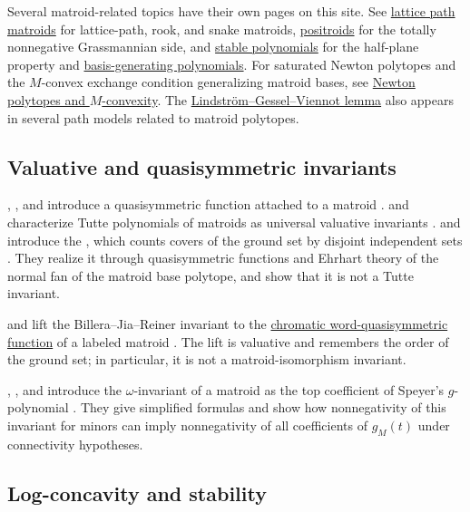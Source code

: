 Several matroid-related topics have their own pages on this site.  See
\hyperref[latticePathMatroids]{lattice path matroids} for lattice-path,
rook, and snake matroids, \hyperref[positroid]{positroids} for the
totally nonnegative Grassmannian side, and
\hyperref[stablePolynomial]{stable polynomials} for the half-plane property
and \hyperref[basisGeneratingPolynomial]{basis-generating polynomials}.  For
saturated Newton polytopes and the
$M$-convex exchange condition generalizing matroid bases, see
\hyperref[newtonPolytopes]{Newton polytopes and $M$-convexity}.  The
\hyperref[lgvLemma]{Lindström--Gessel--Viennot lemma} also appears in several
path models related to matroid polytopes.

\subsection[matroidValuativeInvariants]{Valuative and quasisymmetric invariants}

, , and  introduce
a quasisymmetric function attached to a matroid \cite{BilleraJiaReiner2009}.
 and  characterize Tutte
polynomials of matroids as universal valuative invariants
\cite{FerroniSchroter2024x}.   and
 introduce the , which
counts covers of the ground set by disjoint independent sets
\cite{BreuerKlivans2025x}.  They realize it through quasisymmetric functions
and Ehrhart theory of the normal fan of the matroid base polytope, and show
that it is not a Tutte invariant.

 and  lift the
Billera--Jia--Reiner invariant to the
\hyperref[chromaticWordQuasisymmetricMatroid]{chromatic
word-quasisymmetric function} of a labeled matroid
\cite{PenaguiaoRehberg2026x}.  The lift is valuative and remembers the order
of the ground set; in particular, it is not a matroid-isomorphism invariant.

, , and  introduce the
$\omega$-invariant of a matroid as the top coefficient of Speyer's
$g$-polynomial \cite{FinkShawSpeyer2024x}.  They give simplified formulas and
show how nonnegativity of this invariant for minors can imply nonnegativity of
all coefficients of $g_M(t)$ under connectivity hypotheses.

\subsection[matroidLogConcavityStability]{Log-concavity and stability}

